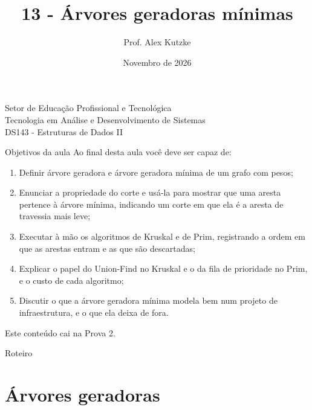 \documentclass{beamer}
\title{13 - Árvores geradoras mínimas}
\author{Prof. Alex Kutzke}
\date{Novembro de 2026}
\begin{document}
\begin{frame}
	\begin{center}
		\large{Setor de Educação Profissional e Tecnológica}\\
		Tecnologia em Análise e Desenvolvimento de Sistemas\\
		\vspace{1cm}
		\small{DS143 - Estruturas de Dados II}
	\end{center}
	\titlepage
\end{frame}

\begin{frame}{Objetivos da aula}
	\footnotesize
	Ao final desta aula você deve ser capaz de:
	\begin{enumerate}
		\item Definir árvore geradora e árvore geradora mínima de um grafo com
		      pesos;
		\item Enunciar a propriedade do corte e usá-la para mostrar que uma
		      aresta pertence à árvore mínima, indicando um corte em que ela é
		      a aresta de travessia mais leve;
		\item Executar à mão os algoritmos de Kruskal e de Prim, registrando a
		      ordem em que as arestas entram e as que são descartadas;
		\item Explicar o papel do Union-Find no Kruskal e o da fila de
		      prioridade no Prim, e o custo de cada algoritmo;
		\item Discutir o que a árvore geradora mínima modela bem num projeto de
		      infraestrutura, e o que ela deixa de fora.
	\end{enumerate}
	\vspace{0.1cm}
	Este conteúdo cai na Prova 2.
\end{frame}

\begin{frame}{Roteiro}
	\tableofcontents
\end{frame}

\section{Árvores geradoras}
\end{document}
